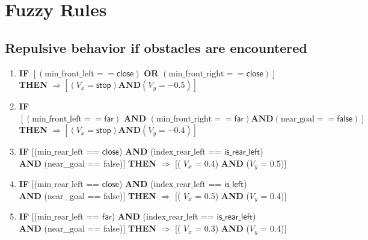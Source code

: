 \section{Fuzzy Rules} 
\subsection{Repulsive behavior if obstacles are encountered}

\begin{enumerate}
	\item \textbf{IF} $\left[\left( \text{min\_front\_left} == \textsf{close}\right) \textbf{ OR } \left(\text{min\_front\_right} == \textsf{close}\right)\right]$\\ 
	\textbf{THEN} $\Rightarrow\left[\left( V_x = \textsf{stop} \right) \textbf{AND} \left(V_y = -0.5\right)\right]$
	
	\item \textbf{IF} $\left[\left( \text{min\_front\_left} == \textsf{far}\right) \textbf{ AND } \left(\text{min\_front\_right} == \textsf{far}\right) \textbf{AND} \left(\text{near\_goal} == \textsf{false}\right)
	\right]$\\ 
	\textbf{THEN} $\Rightarrow\left[\left( V_x = \textsf{stop} \right) \textbf{AND} \left(V_y = -0.4\right)\right]$
	
	\item \textbf{IF} [($\text{min\_rear\_left}$ == $\textsf{close}$) \textbf{AND} ($\text{index\_rear\_left}$ == $\textsf{is\_rear\_left}$)\\
	\textbf{AND} (near\_goal == \textsf{false})]
	\textbf{THEN} $\Rightarrow$ [( $V_x$ = \textsf{0.4}) \textbf{AND} ($V_y$ = \textsf{0.5})]
	
	\item \textbf{IF} [($\text{min\_rear\_left}$ == $\textsf{close}$) \textbf{AND} ($\text{index\_rear\_left}$ == $\textsf{is\_left}$)\\
	\textbf{AND} (near\_goal == \textsf{false})]		\textbf{THEN} $\Rightarrow$ [( $V_x$ = \textsf{0.5}) \textbf{AND} ($V_y$ = \textsf{0.4})]

	\item \textbf{IF} [($\text{min\_rear\_left}$ == $\textsf{far}$) \textbf{AND} ($\text{index\_rear\_left}$ == $\textsf{is\_rear\_left}$)\\
	\textbf{AND} (near\_goal == \textsf{false})]
	\textbf{THEN} $\Rightarrow$ [( $V_x$ = \textsf{0.3}) \textbf{AND} ($V_y$ = \textsf{0.4})]


\end{enumerate}
